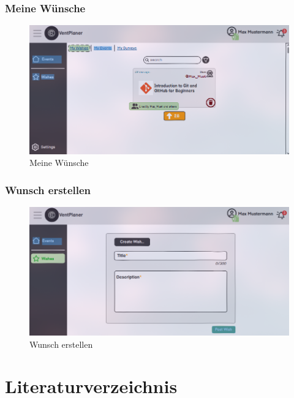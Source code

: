 \documentclass[a4paper,12pt]{article}
\begin{document}
\subsubsection{Meine Wünsche}
\begin{figure}[H]
    \centering
    \includegraphics[width=1\textwidth]{Abbildungen/wishes/my-wishes.png}
    \caption{Meine Wünsche}
    \label{fig:my-wishes}
\end{figure}

\subsubsection{Wunsch erstellen}
\begin{figure}[H]
    \centering
    \includegraphics[width=1\textwidth]{Abbildungen/wishes/create_wish.png}
    \caption{Wunsch erstellen}
    \label{fig:create_wish}
\end{figure}

\newpage


\printglossaries

\newpage


\section{Literaturverzeichnis}
\end{document}
